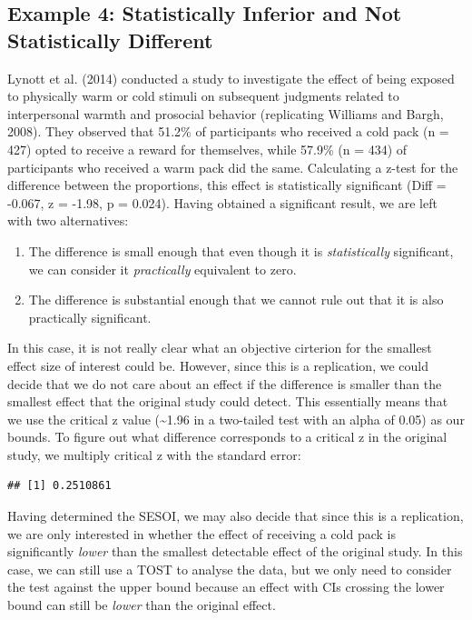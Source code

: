 \documentclass[english,man]{apa6}
\providecommand{\tightlist}{%
  \setlength{\itemsep}{0pt}\setlength{\parskip}{0pt}}
\theoremstyle{definition}
\theoremstyle{definition}
\theoremstyle{definition}
\theoremstyle{remark}
\begin{document}
\subsection{Example 4: Statistically Inferior and Not Statistically
Different}\label{example-4-statistically-inferior-and-not-statistically-different}

Lynott et al. (2014) conducted a study to investigate the effect of
being exposed to physically warm or cold stimuli on subsequent judgments
related to interpersonal warmth and prosocial behavior (replicating
Williams and Bargh, 2008). They observed that 51.2\% of participants who
received a cold pack (n = 427) opted to receive a reward for themselves,
while 57.9\% (n = 434) of participants who received a warm pack did the
same. Calculating a z-test for the difference between the proportions,
this effect is statistically significant (Diff = -0.067, z = -1.98, p =
0.024). Having obtained a significant result, we are left with two
alternatives:

\begin{enumerate}
\def\labelenumi{\arabic{enumi}.}
\tightlist
\item
  The difference is small enough that even though it is
  \emph{statistically} significant, we can consider it
  \emph{practically} equivalent to zero.
\item
  The difference is substantial enough that we cannot rule out that it
  is also practically significant.
\end{enumerate}

In this case, it is not really clear what an objective cirterion for the
smallest effect size of interest could be. However, since this is a
replication, we could decide that we do not care about an effect if the
difference is smaller than the smallest effect that the original study
could detect. This essentially means that we use the critical z value
(\textasciitilde{}1.96 in a two-tailed test with an alpha of 0.05) as
our bounds. To figure out what difference corresponds to a critical z in
the original study, we multiply critical z with the standard error:

\begin{verbatim}
## [1] 0.2510861
\end{verbatim}

Having determined the SESOI, we may also decide that since this is a
replication, we are only interested in whether the effect of receiving a
cold pack is significantly \emph{lower} than the smallest detectable
effect of the original study. In this case, we can still use a TOST to
analyse the data, but we only need to consider the test against the
upper bound because an effect with CIs crossing the lower bound can
still be \emph{lower} than the original effect.
\end{document}

